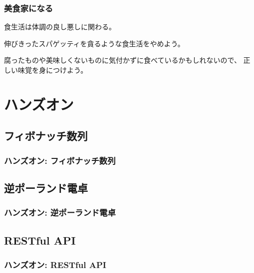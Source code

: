 \documentclass[aspectratio=169]{beamer}
\begin{document}
\begin{frame}\frametitle{美食家になる}
  食生活は体調の良し悪しに関わる。

  伸びきったスパゲッティを貪るような食生活をやめよう。

  腐ったものや美味しくないものに気付かずに食べているかもしれないので、
  正しい味覚を身につけよう。
\end{frame}

\section{ハンズオン}
\subsection{フィボナッチ数列}
\begin{frame}\frametitle{ハンズオン: フィボナッチ数列}
\end{frame}

\subsection{逆ポーランド電卓}
\begin{frame}\frametitle{ハンズオン: 逆ポーランド電卓}
\end{frame}

\subsection{RESTful API}
\begin{frame}\frametitle{ハンズオン: RESTful API}
\end{frame}
\end{document}
